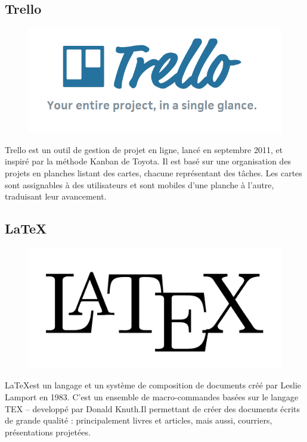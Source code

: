 \documentclass[12pt,a4paper]{report}
\begin{document}
		\subsection{Trello}
		\begin{figure}
		\includegraphics[scale=0.25]{./graphics/trello.png}
		\end{figure}
		Trello est un outil de gestion de projet en ligne, lancé en septembre 2011, et inspiré par la méthode Kanban de Toyota. Il est basé sur une organisation des projets en planches listant des cartes, chacune représentant des tâches. Les cartes sont assignables à des utilisateurs et sont mobiles d'une planche à l'autre, traduisant leur avancement.\\
		
		\newpage
		\subsection{\LaTeX}
		\begin{figure}
		\includegraphics[scale=0.1]{./graphics/latex.png}
		\end{figure}
\LaTeX est un langage et un système de composition de documents
créé par Leslie Lamport en 1983. C’est un ensemble de
macro-commandes basées sur le langage TEX – developpé par
Donald Knuth.Il permettant de créer des documents écrits de grande qualité : principalement livres et articles, mais aussi, courriers, présentations projetées.\\
\end{document}
